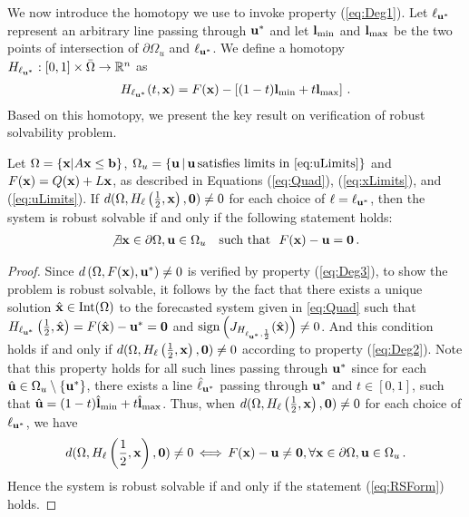 \medskip
We now introduce the homotopy we use to invoke property (\ref{eq:Deg1}).
Let  $\ell_{\mathbf{u}^*}$ represent an arbitrary line passing through $\mathbf{u}^*$ and let $\mathbf{l}_{\min}$ and $\mathbf{l}_{\max}$ be the two points of intersection of $\partial\Omega_u$ and $\ell_{\mathbf{u}^*}$.
We define a homotopy $H_{\ell_{\mathbf{u}^*}} : [0,1]\times\bar{\Omega}\rightarrow\mathbb{R}^n$ as 
\begin{align}
  H_{\ell_{\mathbf{u}^*}}(t,\mathbf{x}) = F(\mathbf{x})-\left[(1-t)\mathbf{l}_{\min}+t\mathbf{l}_{\max}\right]\,. \label{eq:Homo}
\end{align}
Based on this homotopy, we present the key result on verification of robust solvability problem.
%
\begin{lem}
  \label{lem:NaScondition}
  Let $\Omega=\{\mathbf{x}| A\mathbf{x} \leq \mathbf{b} \}$, $\Omega_u=\{\vu \,|\,\vu\, \text{satisfies limits in \cref{eq:uLimits}}\}$ and $F(\mathbf{x})=Q(\mathbf{x})+L\mathbf{x}$,  as described in Equations (\ref{eq:Quad}), (\ref{eq:xLimits}), and (\ref{eq:uLimits}). 
  If $d(\Omega,H_\ell\left(\frac{1}{2},\mathbf{x}\right), \mathbf{0}) \neq 0$ for each choice of $\ell = \ell_{\mathbf{u}^*}$, then the system is robust solvable if and only if the following statement holds:
  \begin{align}
    \not\exists \mathbf{x}\in\partial\Omega, \mathbf{u}\in\Omega_u \ \ \mbox{ such that } \ F(\mathbf{x})-\mathbf{u}=\mathbf{0} \,. \label{eq:RSForm}
  \end{align}
\end{lem}

\begin{proof}
  Since $d\left(\Omega, F(\mathbf{x}), \mathbf{u}^*\right)\neq 0$ is verified by property (\ref{eq:Deg3}), to show the problem is robust solvable, it follows by the fact that there exists a unique solution $\hat{\mathbf{x}}\in \operatorname{Int}(\Omega)$ to the forecasted system given in \cref{eq:Quad} such that  $H_{\ell_{\mathbf{u}^*}}\left(\frac{1}{2},\hat{\mathbf{x}}\right)=F(\hat{\mathbf{x}})-\mathbf{u}^*=\mathbf{0}$ and $ \operatorname{sign}\left(J_{H_{\ell_{\mathbf{u}^*},\frac{1}{2}}}(\hat{\mathbf{x}})\right) \neq 0$.
  And this condition holds if and only if $d(\Omega,H_\ell\left(\frac{1}{2},\mathbf{x}\right),\mathbf{0})\neq 0$ according to property (\ref{eq:Deg2}).
  Note that this property holds for all such lines passing through $\mathbf{u}^*$ since for each $\hat{\mathbf{u}}\in\Omega_u\setminus\{\mathbf{u}^*\}$, there exists a line $\hat{\ell}_{\mathbf{u}^*}$ passing through $\mathbf{u}^*$ and $t\in[0,1]$, such that $\hat{\mathbf{u}}=(1-t)\hat{\mathbf{l}}_{\min}+t\hat{\mathbf{l}}_{\max}$.
  Thus, when $d(\Omega,H_\ell\left(\frac{1}{2},\mathbf{x}\right),\mathbf{0})\neq 0$ for each choice of $\ell_{\mathbf{u}^*}$,   we have 
  \[
    d(\Omega,H_\ell\left(\frac{1}{2},\mathbf{x}\right),\mathbf{0})\neq 0 \, \Longleftrightarrow \,
    F(\mathbf{x}) - \mathbf{u} \neq \mathbf{0}, \forall \mathbf{x} \in \partial\Omega, \mathbf{u} \in \Omega_u \,.
  \]
  Hence the system is robust solvable if and only if the statement  (\ref{eq:RSForm}) holds.
\end{proof}

